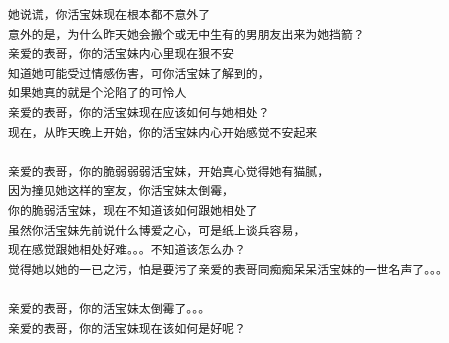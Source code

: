 \documentclass[9pt, b5paper]{article}
\begin{document}
\begin{enumerate}
\begin{verbatim}
她说谎，你活宝妹现在根本都不意外了
意外的是，为什么昨天她会搬个或无中生有的男朋友出来为她挡箭？
亲爱的表哥，你的活宝妹内心里现在狠不安
知道她可能受过情感伤害，可你活宝妹了解到的，
如果她真的就是个沦陷了的可怜人
亲爱的表哥，你的活宝妹现在应该如何与她相处？
现在，从昨天晚上开始，你的活宝妹内心开始感觉不安起来

亲爱的表哥，你的脆弱弱弱活宝妹，开始真心觉得她有猫腻，
因为撞见她这样的室友，你活宝妹太倒霉，
你的脆弱活宝妹，现在不知道该如何跟她相处了
虽然你活宝妹先前说什么博爱之心，可是纸上谈兵容易，
现在感觉跟她相处好难。。。不知道该怎么办？
觉得她以她的一已之污，怕是要污了亲爱的表哥同痴痴呆呆活宝妹的一世名声了。。。

亲爱的表哥，你的活宝妹太倒霉了。。。
亲爱的表哥，你的活宝妹现在该如何是好呢？
\end{verbatim}
\end{enumerate}
\end{document}
